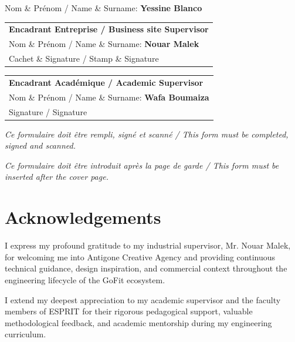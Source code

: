 \documentclass[12pt,a4paper,openany]{report}
\begin{document}
\vspace{1cm}
\noindent Nom \& Pr\'enom / Name \& Surname: \textbf{Yessine Blanco}

\vspace{1.2cm}
\noindent\begin{tabular}{|p{\dimexpr\linewidth-2\tabcolsep-2\arrayrulewidth\relax}|}
\hline
\rule{0pt}{22pt}\textbf{Encadrant Entreprise / Business site Supervisor}\\[10pt]
Nom \& Pr\'enom / Name \& Surname: \textbf{Nouar Malek}\\[12pt]
Cachet \& Signature / Stamp \& Signature\\[3cm]
\hline
\end{tabular}

\vspace{1cm}
\noindent\begin{tabular}{|p{\dimexpr\linewidth-2\tabcolsep-2\arrayrulewidth\relax}|}
\hline
\rule{0pt}{22pt}\textbf{Encadrant Acad\'emique / Academic Supervisor}\\[10pt]
Nom \& Pr\'enom / Name \& Surname: \textbf{Wafa Boumaiza}\\[12pt]
Signature / Signature\\[3cm]
\hline
\end{tabular}

\vspace{1.1cm}
\noindent\textit{Ce formulaire doit \^etre rempli, sign\'e et scann\'e / This form must be completed, signed and scanned.}

\vspace{0.4cm}
\noindent\textit{Ce formulaire doit \^etre introduit apr\`es la page de garde / This form must be inserted after the cover page.}
\par\endgroup
\clearpage

\chapter*{Acknowledgements}

I express my profound gratitude to my industrial supervisor, Mr. Nouar Malek, for welcoming me into Antigone Creative Agency and providing continuous technical guidance, design inspiration, and commercial context throughout the engineering lifecycle of the GoFit ecosystem.


I extend my deepest appreciation to my academic supervisor and the faculty members of ESPRIT for their rigorous pedagogical support, valuable methodological feedback, and academic mentorship during my engineering curriculum.
\end{document}
